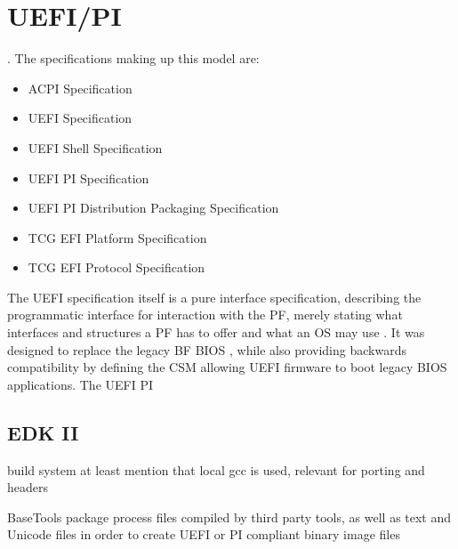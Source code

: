
\chapter{\acs{UEFI}/\acs{PI}}

.
The specifications making up this model are:

\begin{itemize}
    \item \ac{ACPI} Specification
    \item \ac{UEFI} Specification
    \item \ac{UEFI} Shell Specification
    \item \ac{UEFI} \ac{PI} Specification
    \item \ac{UEFI} \ac{PI} Distribution Packaging Specification
    \item \ac{TCG} \ac{EFI} Platform Specification
    \item \ac{TCG} \ac{EFI} Protocol Specification
\end{itemize}

The \ac{UEFI} specification itself is a pure interface specification, describing the programmatic interface for interaction with the \ac{PF}, merely stating what interfaces and structures a \ac{PF} has to offer and what an \ac{OS} may use \cite{beyond-bios}.
It was designed to replace the legacy \acl{BF} \ac{BIOS} , while also providing backwards compatibility by defining the \acf{CSM} allowing \ac{UEFI} firmware to boot legacy \ac{BIOS} applications.
The \ac{UEFI} \ac{PI}





\section{\acs{EDK} II}
build system
at least mention that local gcc is used, relevant for porting and headers

BaseTools package process files compiled by third party tools, as well as text and Unicode files in order to create UEFI or PI compliant binary image files
\cite{tianocore-edk2}